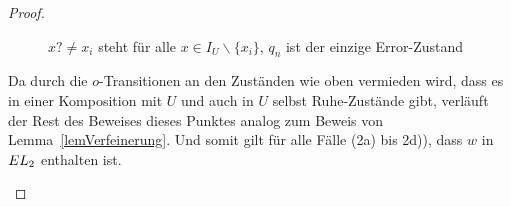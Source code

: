 \begin{proof}
\begin{itemize}
\begin{figure} [h!tbp]
\begin{center}
        \caption{$x?\neq x_i$ steht für alle $x\in I_U\backslash\{x_i\}$, $q_n$
          ist der einzige Error-Zustand}
\label{UmitEundO}
      \end{center}
      \end{figure}
      Da durch die $o$-Transitionen an den Zuständen wie oben vermieden wird,
      dass es in einer Komposition mit $U$ und auch in $U$ selbst Ruhe-Zustände
      gibt, verläuft der Rest des Beweises dieses Punktes analog zum Beweis von
      Lemma~\ref{lemVerfeinerung}. Und somit gilt für alle Fälle (2a) bis 2d)),
      dass $w$ in $EL{}_2$ enthalten ist. %
  \end{itemize}


\end{proof}
